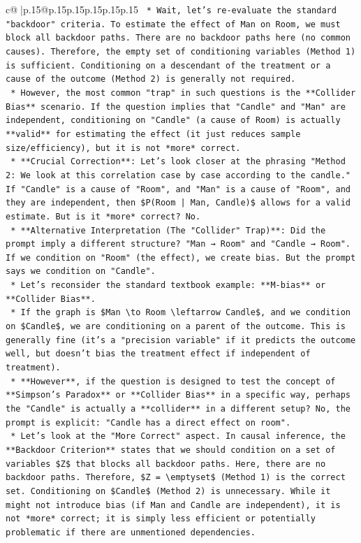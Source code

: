 \documentclass{article}
\begin{document}
{\begin{supertabular}{c@{$\;$}|p{.15\linewidth}@{}p{.15\linewidth}p{.15\linewidth}p{.15\linewidth}p{.15\linewidth}p{.15\linewidth}}
{{{\texttt{    *   Wait, let's re{-}evaluate the standard "backdoor" criteria. To estimate the effect of Man on Room, we must block all backdoor paths. There are no backdoor paths here (no common causes). Therefore, the empty set of conditioning variables (Method 1) is sufficient. Conditioning on a descendant of the treatment or a cause of the outcome (Method 2) is generally not required.} \\
\texttt{    *   However, the most common "trap" in such questions is the **Collider Bias** scenario. If the question implies that "Candle" and "Man" are independent, conditioning on "Candle" (a cause of Room) is actually **valid** for estimating the effect (it just reduces sample size/efficiency), but it is not *more* correct.} \\
\texttt{    *   **Crucial Correction**: Let's look closer at the phrasing "Method 2: We look at this correlation case by case according to the candle." If "Candle" is a cause of "Room", and "Man" is a cause of "Room", and they are independent, then \$P(Room | Man, Candle)\$ allows for a valid estimate. But is it *more* correct? No.} \\
\texttt{    *   **Alternative Interpretation (The "Collider" Trap)**: Did the prompt imply a different structure? "Man → Room" and "Candle → Room". If we condition on "Room" (the effect), we create bias. But the prompt says we condition on "Candle".} \\
\texttt{    *   Let's reconsider the standard textbook example: **M{-}bias** or **Collider Bias**.} \\
\texttt{        *   If the graph is \$Man \textbackslash{}to Room \textbackslash{}leftarrow Candle\$, and we condition on \$Candle\$, we are conditioning on a parent of the outcome. This is generally fine (it's a "precision variable" if it predicts the outcome well, but doesn't bias the treatment effect if independent of treatment).} \\
\texttt{        *   **However**, if the question is designed to test the concept of **Simpson's Paradox** or **Collider Bias** in a specific way, perhaps the "Candle" is actually a **collider** in a different setup? No, the prompt is explicit: "Candle has a direct effect on room".} \\
\texttt{    *   Let's look at the "More Correct" aspect. In causal inference, the **Backdoor Criterion** states that we should condition on a set of variables \$Z\$ that blocks all backdoor paths. Here, there are no backdoor paths. Therefore, \$Z = \textbackslash{}emptyset\$ (Method 1) is the correct set. Conditioning on \$Candle\$ (Method 2) is unnecessary. While it might not introduce bias (if Man and Candle are independent), it is not *more* correct; it is simply less efficient or potentially problematic if there are unmentioned dependencies.} \\
}}}
\end{supertabular}}
\end{document}
